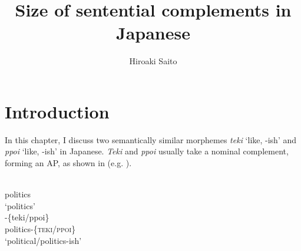 \documentclass[output=paper]{langscibook}
\author{Hiroaki Saito\affiliation{Mie University; University of Connecticut}}
\title{Size of sentential complements in Japanese}
\begin{document}
\maketitle

\section{Introduction}
In this chapter, I discuss two semantically similar morphemes \emph{teki} ‘like, -ish’ and \emph{ppoi} ‘like, -ish’ in Japanese.  \emph{Teki} and \emph{ppoi} usually take a nominal complement, forming an AP, as shown in  (e.g. \citealt{KaiserYamamoto2001}). 

\begin{multicols}{2}
\begin{exe}
\ex \label{saito1}
\begin{xlist}
\ex \label{saito1a}
\\ 
politics\\
\glt `politics'\\

\ex \label{saito1b}
-\{{teki/ppoi}\}\\
politics-\{\textsc{teki/ppoi}\}\\
\glt `political/politics-ish'
\end{xlist}
\end{exe}
\end{multicols}
\end{document}
